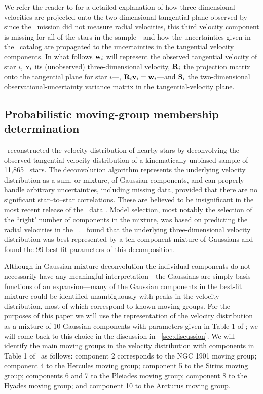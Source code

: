 We refer the reader to \citet[][hereafter \bhr]{Bovyveldist} for a
detailed explanation of how three-dimensional velocities are projected
onto the two-dimensional tangential plane observed by
\Hipparcos---since the \Hipparcos\ mission did not measure radial
velocities, this third velocity component is missing for all of the
stars in the sample---and how the uncertainties given in the
\Hipparcos\ catalog are propagated to the uncertainties in the
tangential velocity components. In what follows $\mathbf{w}_i$ will represent
the observed tangential velocity of star $i$, $\boldsymbol{\mathbf{v}}_i$ its (unobserved)
three-dimensional velocity, $\mathbf{R}_i$ the projection matrix onto the
tangential plane for star $i$---\ie, $\mathbf{R}_i \boldsymbol{\mathbf{v}}_i = \mathbf{w}_i$---and $\mathbf{S}_i$
the two-dimensional observational-uncertainty variance matrix in the
tangential-velocity plane.



\subsection{Probabilistic moving-group membership determination}\label{sec:member}

\bhr\ reconstructed the velocity distribution of nearby stars by
deconvolving the observed tangential velocity distribution of a
kinematically unbiased sample of 11,865 \Hipparcos\ stars. The
deconvolution algorithm \citep{BovyXD} represents the underlying
velocity distribution as a sum, or mixture, of Gaussian components,
and can properly handle arbitrary uncertainties, including missing
data, provided that there are no significant star--to--star
correlations. These are believed to be insignificant in the most
recent release of the \Hipparcos\
data \citep{2007ASSL..250.....V}. Model selection, most notably the
selection of the ``right' number of components in the mixture, was
based on predicting the radial velocities in
the \gcs\ \citep[\gcsabb;][]{2004A&A...418..989N}. \bhr\ found that
the underlying three-dimensional velocity distribution was best
represented by a ten-component mixture of Gaussians and found the 99
best-fit parameters of this decomposition.

Although in Gaussian-mixture deconvolution the individual components
do not necessarily have any meaningful interpretation---the Gaussians
are simply basis functions of an expansion---many of the Gaussian
components in the best-fit mixture could be identified unambiguously
with peaks in the velocity distribution, most of which correspond to
known moving groups. For the purposes of this paper we will use the
representation of the velocity distribution as a mixture of 10
Gaussian components with parameters given in Table 1 of \bhr; we will
come back to this choice in the discussion in
\sectionname~\ref{sec:discussion}. We will identify the main moving
groups in the velocity distribution with components in Table 1 of
\bhr\ as follows: component 2 corresponds to the NGC 1901 moving
group; component 4 to the Hercules moving group; component 5 to the
Sirius moving group; components 6 and 7 to the Pleiades moving group;
component 8 to the Hyades moving group; and component 10 to the
Arcturus moving group.

